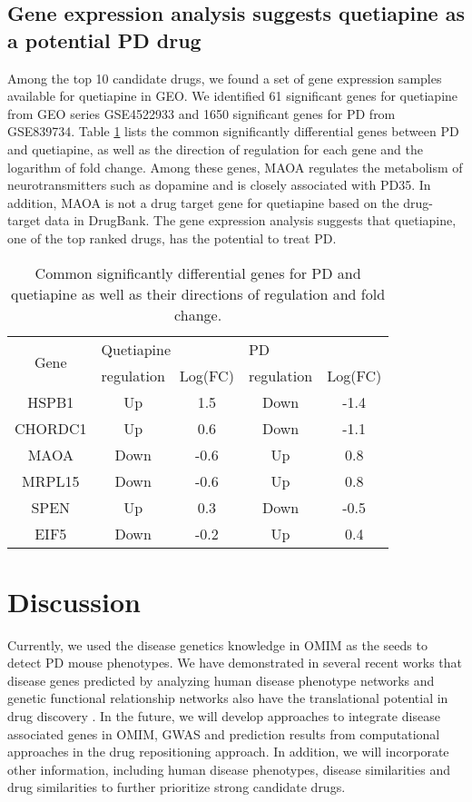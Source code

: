   \subsection{Gene expression analysis suggests quetiapine as a potential PD drug}
  Among the top 10 candidate drugs, we found a set of gene expression samples available for quetiapine in GEO. We identified 61 significant genes for quetiapine from GEO series GSE4522933 and 1650 significant genes for PD from GSE839734. Table \ref{mphenGEO} lists the common significantly differential genes between PD and quetiapine, as well as the direction of regulation for each gene and the logarithm of fold change. Among these genes, MAOA regulates the metabolism of neurotransmitters such as dopamine and is closely associated with PD35. In addition, MAOA is not a drug target gene for quetiapine based on the drug-target data in DrugBank. The gene expression analysis suggests that quetiapine, one of the top ranked drugs, has the potential to treat PD.
   \begin{table}[h!]
\caption{Common significantly differential genes for PD and quetiapine as well as their directions of regulation and fold change.}
  \label{mphenGEO}
  \centering
      \begin{tabular}{ccccc}
        \hline
        \multirow{2}{*}{Gene}&\multicolumn{2}{l}{Quetiapine}&\multicolumn{2}{l}{PD}\\
                                                &regulation&Log(FC)&regulation&Log(FC)\\ \hline
        HSPB1	&Up	&1.5	&Down 	&-1.4\\
CHORDC1	&Up	&0.6	&Down	&-1.1\\
MAOA	&Down	&-0.6	&Up	&0.8\\
MRPL15	&Down	&-0.6	&Up	&0.8\\
SPEN	&Up	&0.3	&Down	&-0.5\\
EIF5	&Down	&-0.2	&Up	&0.4\\


\hline
\end{tabular}
\end{table}

\section{Discussion}
Currently, we used the disease genetics knowledge in OMIM as the seeds to detect PD mouse phenotypes. We have demonstrated in several recent works that disease genes predicted by analyzing human disease phenotype networks and genetic functional relationship networks also have the translational potential in drug discovery \cite{chen2014comparative,chen2014malaria,chen2014phenome}. In the future, we will develop approaches to integrate disease associated genes in OMIM, GWAS and prediction results from computational approaches in the drug repositioning approach. In addition, we will incorporate other information, including human disease phenotypes, disease similarities and drug similarities to further prioritize strong candidate drugs.


